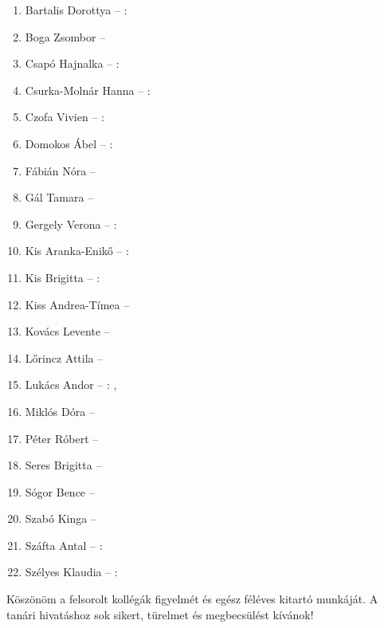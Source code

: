 \documentclass[magyar]{package/fancy-book}
\begin{document}
\begin{enumerate}
	\item Bartalis Dorottya -- : 
	\item Boga Zsombor -- 
	\item Csapó Hajnalka -- : 
	\item Csurka-Molnár Hanna -- : 
	\item Czofa Vivien -- : 
	\item Domokos Ábel -- : 
	\item Fábián Nóra -- 
	\item Gál Tamara -- 
	\item Gergely Verona -- : 
	\item Kis Aranka-Enikő -- : 
	\item Kis Brigitta -- : 
	\item Kiss Andrea-Tímea -- 
	\item Kovács Levente -- 
	\item Lőrincz Attila -- 
	\item Lukács Andor -- : , 
	\item Miklós Dóra -- 
	\item Péter Róbert -- 
	\item Seres Brigitta -- 
	\item Sógor Bence -- 
	\item Szabó Kinga -- 
	\item Száfta Antal -- : 
	\item Szélyes Klaudia -- : 
\end{enumerate}
Köszönöm a felsorolt kollégák figyelmét és egész féléves kitartó munkáját.
A tanári hivatáshoz sok sikert, türelmet és megbecsülést kívánok!

\vspace*{1cm}
\end{document}
